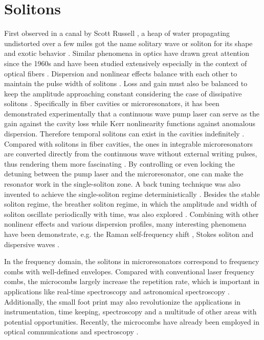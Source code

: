 \section{Solitons}
First observed in a canal by Scott Russell \cite{russell1844report}, a heap of water propagating undistorted over a few miles got the name solitary wave or soliton for its shape and exotic behavior \cite{zabusky1965interaction}. Similar phenomena in optics have drawn great attention since the 1960s and have been studied extensively especially in the context of optical fibers \cite{agrawal2007nonlinear, hasegawa1973transmission, andrekson1999soliton}. Dispersion and nonlinear effects balance with each other to maintain the pulse width of solitons \cite{agrawal2007nonlinear, akhmediev2008three}. Loss and gain must also be balanced to keep the amplitude approaching constant considering the case of dissipative solitons \cite{akhmediev2008three}. Specifically in fiber cavities or microresonators, it has been demonstrated experimentally that a continuous wave pump laser can serve as the gain against the cavity loss while Kerr nonlinearity functions against anomalous dispersion. Therefore temporal solitons can exist in the cavities indefinitely \cite{leo2010temporal, herr2014temporal, yi2015soliton}. Compared with solitons in fiber cavities, the ones in integrable microresonators are converted directly from the continuous wave without external writing pulses, thus rendering them more fascinating \cite{herr2014temporal, yi2015soliton}. By controlling \cite{herr2014temporal} or even locking \cite{yi2015soliton} the detuning between the pump laser and the microresonator, one can make the resonator work in the single-soliton zone. A back tuning technique was also invented to achieve the single-soliton regime deterministically \cite{guo2016universal}. Besides the stable soliton regime, the breather soliton regime, in which the amplitude and width of soliton oscillate periodically with time, was also explored \cite{lucas2016breathing}. Combining with other nonlinear effects and various dispersion profiles, many interesting phenomena have been demonstrate, e.g. the Raman self-frequency shift \cite{karpov2016raman, yi2016theory}, Stokes soliton \cite{yang2016stokes} and dispersive waves \cite{brasch2016photonic, yang2016spatial, lucas2016study, yi2017single}. 

In the frequency domain, the solitons in microresonators correspond to frequency combs with well-defined envelopes. Compared with conventional laser frequency combs, the microcombs largely increase the repetition rate, which is important in applications like real-time spectroscopy \cite{bernhardt2010cavity} and astronomical spectroscopy \cite{steinmetz2008laser}. Additionally, the small foot print may also revolutionize the applications in instrumentation, time keeping, spectroscopy and a multitude of other areas with potential opportunities\cite{yi2015soliton}. Recently, the microcombs have already been employed in optical communications\cite{marin2016microresonator} and spectroscopy \cite{suh2016microresonator, liu2016frequency}.




